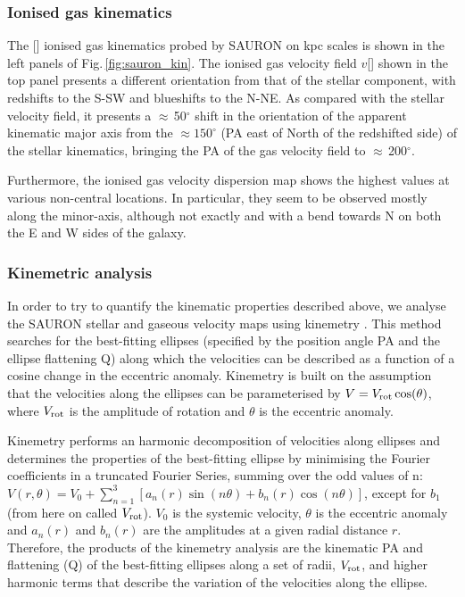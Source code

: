 \documentclass[fleqn,usenatbib]{mnras}
\begin{document}
\subsubsection{Ionised gas kinematics}

The [] ionised gas kinematics probed by SAURON on kpc scales is shown in the left panels of Fig.\,\ref{fig:sauron_kin}. The ionised gas velocity field $v$[] shown in the top panel presents a different orientation from that of the stellar component, with redshifts to the S-SW and blueshifts to the N-NE. As compared with the stellar velocity field, it presents a $\approx$\,50$^\circ$ shift in the orientation of the apparent kinematic major axis from the $\approx150^\circ$ (PA east of North of the redshifted side) of the stellar kinematics, bringing the PA of the gas velocity field to $\approx$\,200$^\circ$. 

Furthermore, the ionised gas velocity dispersion map shows the highest values at various non-central locations. In particular, they seem to be observed mostly along the minor-axis, although not exactly and with a bend towards N on both the E and W sides of the galaxy. 

\subsubsection{Kinemetric analysis}
\label{ss:kinemetry}

In order to try to quantify the kinematic properties described above, we analyse the SAURON stellar and gaseous velocity maps using kinemetry \citep{krajnovic_kinemetry_2006}. This method searches for the best-fitting ellipses  (specified by the position angle PA and the ellipse flattening Q) along which the velocities can be described as a function of a cosine change in the eccentric anomaly. Kinemetry is built on the assumption that the velocities along the ellipses can be parameterised by $V = V_{\rm rot} \cos(\theta)$, where $V_{\rm rot}$ is the amplitude of rotation and $\theta$ is the eccentric anomaly. 

Kinemetry performs an harmonic decomposition of velocities along ellipses and determines the properties of the best-fitting ellipse by minimising the Fourier coefficients in a truncated Fourier Series, summing over the odd values of n: $V(r,\theta) = V_0 + \sum_{n=1}^3[ a_n(r) \sin(n\theta) + b_n(r) \cos(n\theta)]$, except for $b_1$ (from here on called $V_{\rm rot}$). $V_0$ is the systemic velocity, $\theta$ is the eccentric anomaly and $a_n(r)$ and $b_n(r)$ are the amplitudes at a given radial distance $r$. Therefore, the products of the kinemetry analysis are the kinematic PA and flattening (Q) of the best-fitting ellipses along a set of radii, $V_{\rm rot}$, and higher harmonic terms that describe the variation of the velocities along the ellipse. 
\end{document}
